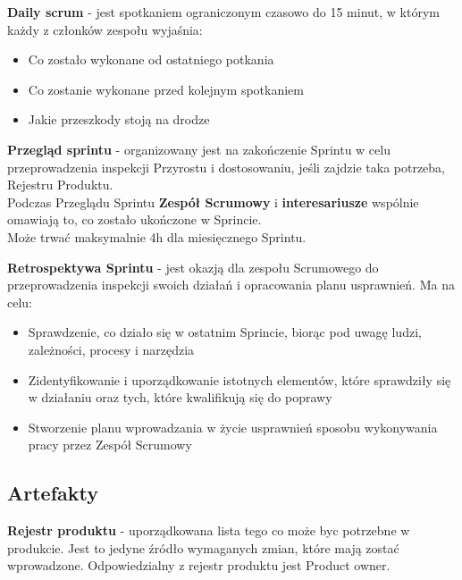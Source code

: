 \documentclass[12pt]{article}
\begin{document}
    \begin{definition}
        \textbf{Daily scrum} - jest spotkaniem ograniczonym czasowo do 15 minut, w którym każdy z członków zespołu wyjaśnia:
        \begin{itemize}
            \item Co zostało wykonane od ostatniego potkania
            \item Co zostanie wykonane przed kolejnym spotkaniem
            \item Jakie przeszkody stoją na drodze
        \end{itemize}
    \end{definition}

    \begin{definition}
        \textbf{Przegląd sprintu} - organizowany jest na zakończenie Sprintu w celu przeprowadzenia inspekcji Przyrostu i dostosowaniu, jeśli zajdzie taka potrzeba, Rejestru Produktu. \\
        Podczas Przeglądu Sprintu \textbf{Zespół Scrumowy} i \textbf{interesariusze} wspólnie omawiają to, co zostało ukończone w Sprincie. \\
        Może trwać maksymalnie 4h dla miesięcznego Sprintu.
    \end{definition}

    \begin{definition}
        \textbf{Retrospektywa Sprintu} - jest okazją dla zespołu Scrumowego do przeprowadzenia inspekcji swoich działań i opracowania planu usprawnień. Ma na celu:
        \begin{itemize}
            \item Sprawdzenie, co działo się w ostatnim Sprincie, biorąc pod uwagę ludzi, zależności, procesy i narzędzia
            \item Zidentyfikowanie i uporządkowanie istotnych elementów, które sprawdziły się w działaniu oraz tych, które kwalifikują się do poprawy
            \item Stworzenie planu wprowadzania w życie usprawnień sposobu wykonywania pracy przez Zespół Scrumowy
        \end{itemize}
    \end{definition}

    \subsection{Artefakty}

    \begin{definition}
        \textbf{Rejestr produktu} - uporządkowana lista tego co może byc potrzebne w produkcie. Jest to jedyne źródło wymaganych zmian, które mają zostać wprowadzone.
        Odpowiedzialny z rejestr produktu jest Product owner.
    \end{definition}
\end{document}
